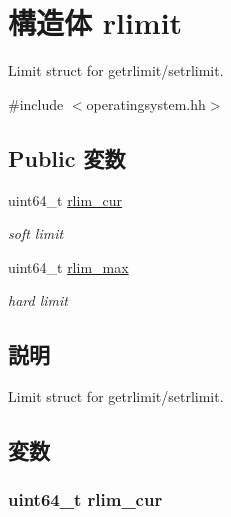 \hypertarget{structOperatingSystem_1_1rlimit}{
\section{構造体 rlimit}
\label{structOperatingSystem_1_1rlimit}
}


Limit struct for getrlimit/setrlimit.  


{\ttfamily \#include $<$operatingsystem.hh$>$}\subsection*{Public 変数}
\begin{DoxyCompactItemize}
\item 
uint64\_\-t \hyperlink{structOperatingSystem_1_1rlimit_af39897d07737cb27ef9484ae73c05fa4}{rlim\_\-cur}
\begin{DoxyCompactList}\small\item\em soft limit \item\end{DoxyCompactList}\item 
uint64\_\-t \hyperlink{structOperatingSystem_1_1rlimit_af8e4fdfd658610e9b762fb606dce339a}{rlim\_\-max}
\begin{DoxyCompactList}\small\item\em hard limit \item\end{DoxyCompactList}\end{DoxyCompactItemize}


\subsection{説明}
Limit struct for getrlimit/setrlimit. 

\subsection{変数}
\hypertarget{structOperatingSystem_1_1rlimit_af39897d07737cb27ef9484ae73c05fa4}{
\subsubsection[{rlim\_\-cur}]{\setlength{\rightskip}{0pt plus 5cm}uint64\_\-t {\bf rlim\_\-cur}}}
\label{structOperatingSystem_1_1rlimit_af39897d07737cb27ef9484ae73c05fa4}


